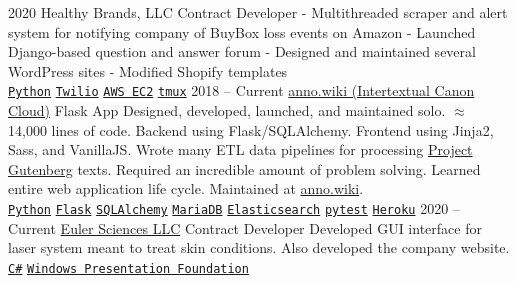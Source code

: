 \documentclass[9pt]{developercv} %
\begin{document}


\begin{entrylist}
	\entry
		{2020}
        {Healthy Brands, LLC}
		{Contract Developer}
        {
            - Multithreaded scraper and alert system for notifying company of
            BuyBox loss events on Amazon
            - Launched Django-based question and answer forum
            - Designed and maintained several WordPress sites
            - Modified Shopify templates
        \\
        \texttt{{\href{https://www.python.org/}{Python}}}\slashsep
        \texttt{{\href{https://www.twilio.com/}{Twilio}}}\slashsep
        \texttt{{\href{https://aws.amazon.com/ec2/}{AWS EC2}}}\slashsep
        \texttt{{\href{https://github.com/tmux/tmux}{tmux}}}
        }
	\entry
		{2018 -- Current}
        {{\href{https://github.com/malan88/icc}{anno.wiki (Intertextual Canon Cloud)}}}
		{Flask App}
        {Designed, developed, launched, and maintained solo. $\approx$ 14,000
        lines of code. Backend using Flask/SQLAlchemy. Frontend using Jinja2,
        Sass, and VanillaJS. Wrote many ETL data pipelines for processing
        {\href{https://gutenberg.org}{Project Gutenberg}} texts. Required an
        incredible amount of problem solving. Learned entire web application
        life cycle. Maintained at {\href{https://anno.wiki}{anno.wiki}}.
        \\
        \texttt{{\href{https://www.python.org/}{Python}}}\slashsep
        \texttt{{\href{https://flask.palletsprojects.com/en/1.1.x/}{Flask}}}\slashsep
        \texttt{{\href{https://www.sqlalchemy.org/}{SQLAlchemy}}}\slashsep
        \texttt{{\href{https://mariadb.org/}{MariaDB}}}\slashsep
        \texttt{{\href{https://www.elastic.co/}{Elasticsearch}}}\slashsep
        \texttt{{\href{https://docs.pytest.org/en/stable/}{pytest}}}\slashsep
        \texttt{{\href{https://www.heroku.com/}{Heroku}}}
        }
	\entry
		{2020 -- Current}
        {\href{https://euler-sci.com}{Euler Sciences LLC}}
		{Contract Developer}
        {Developed GUI interface for laser system meant to treat skin
        conditions. Also developed the company website.
        \\
        \texttt{{\href{https://en.wikipedia.org/wiki/C_Sharp_(programming_language)}{C\#}}}\slashsep
        \texttt{{\href{https://en.wikipedia.org/wiki/Windows_Presentation_Foundation}{Windows Presentation Foundation}}}\slashsep
}
\end{entrylist}
\end{document}
